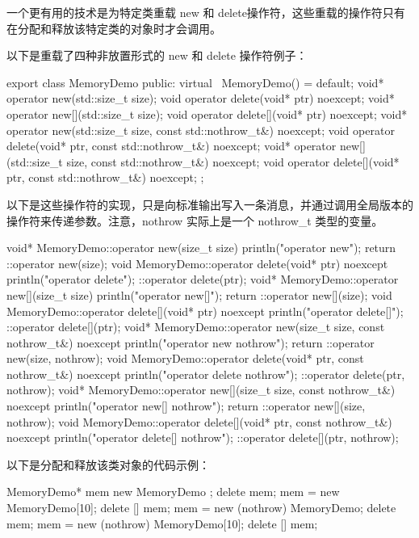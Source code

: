 一个更有用的技术是为特定类重载 new 和 delete操作符，这些重载的操作符只有在分配和释放该特定类的对象时才会调用。

以下是重载了四种非放置形式的 new 和 delete 操作符例子：

\begin{cpp}
export class MemoryDemo
{
    public:
        virtual ~MemoryDemo() = default;
        void* operator new(std::size_t size);
        void operator delete(void* ptr) noexcept;
        void* operator new[](std::size_t size);
        void operator delete[](void* ptr) noexcept;
        void* operator new(std::size_t size, const std::nothrow_t&) noexcept;
        void operator delete(void* ptr, const std::nothrow_t&) noexcept;
        void* operator new[](std::size_t size, const std::nothrow_t&) noexcept;
        void operator delete[](void* ptr, const std::nothrow_t&) noexcept;
};
\end{cpp}

以下是这些操作符的实现，只是向标准输出写入一条消息，并通过调用全局版本的操作符来传递参数。注意，nothrow 实际上是一个 nothrow\_t 类型的变量。

\begin{cpp}
void* MemoryDemo::operator new(size_t size)
{
    println("operator new");
    return ::operator new(size);
}
void MemoryDemo::operator delete(void* ptr) noexcept
{
    println("operator delete");
    ::operator delete(ptr);
}
void* MemoryDemo::operator new[](size_t size)
{
    println("operator new[]");
    return ::operator new[](size);
}
void MemoryDemo::operator delete[](void* ptr) noexcept
{
    println("operator delete[]");
    ::operator delete[](ptr);
}
void* MemoryDemo::operator new(size_t size, const nothrow_t&) noexcept
{
    println("operator new nothrow");
    return ::operator new(size, nothrow);
}
void MemoryDemo::operator delete(void* ptr, const nothrow_t&) noexcept
{
    println("operator delete nothrow");
    ::operator delete(ptr, nothrow);
}
void* MemoryDemo::operator new[](size_t size, const nothrow_t&) noexcept
{
    println("operator new[] nothrow");
    return ::operator new[](size, nothrow);
}
void MemoryDemo::operator delete[](void* ptr, const nothrow_t&) noexcept
{
    println("operator delete[] nothrow");
    ::operator delete[](ptr, nothrow);
}
\end{cpp}

以下是分配和释放该类对象的代码示例：

\begin{cpp}
MemoryDemo* mem { new MemoryDemo{} };
delete mem;
mem = new MemoryDemo[10];
delete [] mem;
mem = new (nothrow) MemoryDemo{};
delete mem;
mem = new (nothrow) MemoryDemo[10];
delete [] mem;
\end{cpp}


